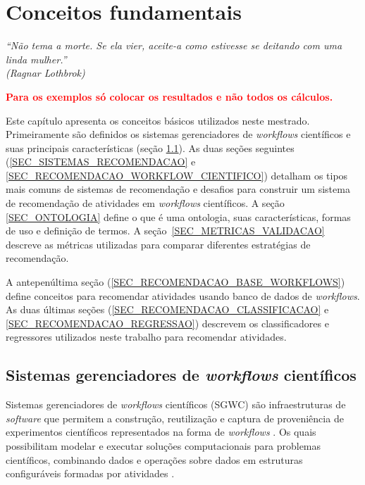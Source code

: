 \chapter{Conceitos fundamentais}\label{CAP_CONCEITOS_FUNDAMENTAIS}
\begin{flushright}
	\textit{``Não tema a morte. Se ela vier, aceite-a como estivesse se deitando com uma linda mulher.''\\
	(Ragnar Lothbrok)}
\end{flushright}

\textbf{\textcolor{red}{Para os  exemplos só colocar os resultados e não todos os cálculos.}}
\newpage

Este capítulo apresenta os conceitos básicos utilizados neste mestrado. Primeiramente são definidos os sistemas gerenciadores de \emph{workf\mbox{}lows} científ\mbox{}icos e suas principais características (seção \ref{SEC_SISTEMA_GERENCIADOR_WORKFLOW}). As duas seções seguintes (\ref{SEC_SISTEMAS_RECOMENDACAO} e \ref{SEC_RECOMENDACAO_WORKFLOW_CIENTIFICO}) detalham os tipos mais comuns de sistemas de recomendação e desafios para construir um sistema de recomendação de atividades em \emph{workf\mbox{}lows} científ\mbox{}icos. A seção \ref{SEC_ONTOLOGIA} define o que é uma ontologia, suas características, formas de uso e definição de termos. A seção~\ref{SEC_METRICAS_VALIDACAO} descreve as métricas utilizadas para comparar diferentes estratégias de recomendação. 

A antepenúltima seção (\ref{SEC_RECOMENDACAO_BASE_WORKFLOWS}) define conceitos para recomendar atividades usando banco de dados de \emph{workf\mbox{}lows}. As duas últimas seções (\ref{SEC_RECOMENDACAO_CLASSIFICACAO} e \ref{SEC_RECOMENDACAO_REGRESSAO}) descrevem os classificadores e regressores utilizados neste trabalho para recomendar atividades.


\section{Sistemas gerenciadores de \emph{workf\mbox{}lows} científ\mbox{}icos}\label{SEC_SISTEMA_GERENCIADOR_WORKFLOW}
Sistemas gerenciadores de \emph{workflows} científicos (SGWC) são infraestruturas de \emph{software} que permitem a construção, reutilização e captura de proveniência de experimentos científicos representados na forma de \emph{workflows} \cite{McPhillips2009}. Os quais possibilitam modelar e executar soluções computacionais para problemas científicos, combinando dados e operações sobre dados em estruturas configuráveis formadas por atividades \cite{Garijo2014}.

